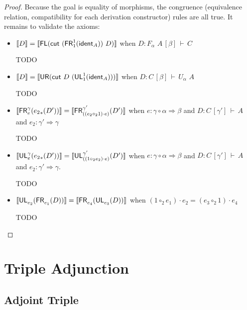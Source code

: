 \documentclass{drl-common/llncs}
\renewcommand{\sem}[1]{\ensuremath{ \llbracket #1 \rrbracket}}
\newcommand{\tc}[2]{\ensuremath{#1 \Rightarrow #2}}
\newcommand\compo[2]{\ensuremath{#1 \circ #2}}
\newcommand\compv[2]{\ensuremath{#1 \cdot #2}}
\newcommand\comph[2]{\ensuremath{#1 \mathbin{\circ_2} #2}}
\newcommand\F[2]{\ensuremath{F_{#1} \,\, #2}}
\newcommand\U[2]{\ensuremath{U_{#1} \,\, #2}}
\newcommand\seq[3]{\ensuremath{#1 \, [ #2 ] \, \vdash \, #3}}
\newcommand\tr[2]{\ensuremath{{{#1}_{*}(#2)}}}
\newcommand\ident[1]{\ensuremath{\dsd{ident}_{#1}}}
\newcommand\cut[2]{\ensuremath{{\dsd{cut} \,\, #1 \,\, #2}}}
\newcommand\UL[3]{\ensuremath{\dsd{UL}^{#1}_{#2}(#3)}}
\newcommand\FR[3]{\ensuremath{\dsd{FR}^{#1}_{#2}(#3)}}
\newcommand\FL[1]{\ensuremath{\dsd{FL}(#1)}}
\newcommand\UR[1]{\ensuremath{\dsd{UR}(#1)}}
\begin{document}
\begin{proof}
Because the goal is equality of morphisms, the congruence (equivalence
relation, compatibility for each derivation constructor) rules are all
true.  It remains to validate the axioms:

\begin{itemize}
\item $\sem{D} = \sem{\FL {\cut{(\FR 1 1 {\ident{A}})}{D}} }$
when ${D : \seq{\F \alpha A}{\beta}{C}}$

TODO

\item $\sem{D} = \sem{\UR {\cut{D}{(\UL 1 1 {\ident{A}})}}}$
when ${D : \seq{C}{\beta}{\U \alpha A}}$

TODO

\item $\sem{{\FR{\gamma}{e}{\tr{e_2}{D'}}}} = \sem{\FR{\gamma'}{(\compv{(\comph{e_2}{1})}{e})}{D'}}$
when $e : \tc{\compo{\gamma}{\alpha}}{\beta}$
and $D : \seq{C}{\gamma'}{A}$
and $e_2 : \tc{\gamma'}{\gamma}$

TODO

\item $\sem{\UL{\gamma}{e}{\tr{e_2}{D'}}} = \sem{\UL{\gamma'}{(\compv{(\comph{1}{e_2})}{e})}{D'}}$
when $e : \tc{\compo{\gamma}{\alpha}}{\beta}$
and $D : \seq{C}{\gamma'}{A}$
and $e_2 : \tc{\gamma'}{\gamma}$.

TODO

\item $\sem{\UL {}{e_2} {\FR {} {e_1} {D}}} = \sem{\FR {} {e_4} {\UL {} {e_3} {D}}}$
when ${\compv{(\comph{1}{e_1})}{e_2} = {\compv{(\comph{e_3}{1})}{e_4}}}$

TODO

\end{itemize}
\end{proof}


\section{Triple Adjunction}
\label{sec:triple}


\subsection{Adjoint Triple}
\end{document}
